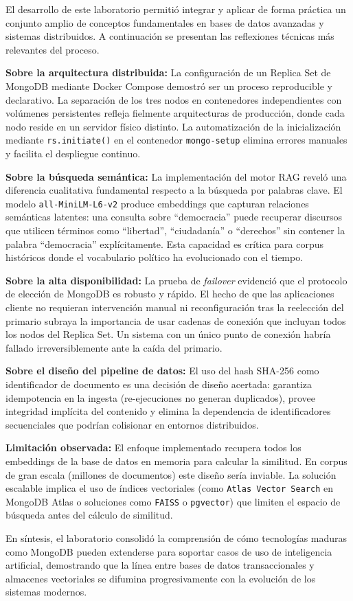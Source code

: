 \documentclass[12pt,a4paper]{article}
\begin{document}
El desarrollo de este laboratorio permitió integrar y aplicar de forma práctica un conjunto amplio de conceptos fundamentales en bases de datos avanzadas y sistemas distribuidos. A continuación se presentan las reflexiones técnicas más relevantes del proceso.

\textbf{Sobre la arquitectura distribuida:} La configuración de un Replica Set de MongoDB mediante Docker Compose demostró ser un proceso reproducible y declarativo. La separación de los tres nodos en contenedores independientes con volúmenes persistentes refleja fielmente arquitecturas de producción, donde cada nodo reside en un servidor físico distinto. La automatización de la inicialización mediante \texttt{rs.initiate()} en el contenedor \texttt{mongo-setup} elimina errores manuales y facilita el despliegue continuo.

\textbf{Sobre la búsqueda semántica:} La implementación del motor RAG reveló una diferencia cualitativa fundamental respecto a la búsqueda por palabras clave. El modelo \texttt{all-MiniLM-L6-v2} produce embeddings que capturan relaciones semánticas latentes: una consulta sobre ``democracia'' puede recuperar discursos que utilicen términos como ``libertad'', ``ciudadanía'' o ``derechos'' sin contener la palabra ``democracia'' explícitamente. Esta capacidad es crítica para corpus históricos donde el vocabulario político ha evolucionado con el tiempo.

\textbf{Sobre la alta disponibilidad:} La prueba de \textit{failover} evidenció que el protocolo de elección de MongoDB es robusto y rápido. El hecho de que las aplicaciones cliente no requieran intervención manual ni reconfiguración tras la reelección del primario subraya la importancia de usar cadenas de conexión que incluyan todos los nodos del Replica Set. Un sistema con un único punto de conexión habría fallado irreversiblemente ante la caída del primario.

\textbf{Sobre el diseño del pipeline de datos:} El uso del hash SHA-256 como identificador de documento es una decisión de diseño acertada: garantiza idempotencia en la ingesta (re-ejecuciones no generan duplicados), provee integridad implícita del contenido y elimina la dependencia de identificadores secuenciales que podrían colisionar en entornos distribuidos.

\textbf{Limitación observada:} El enfoque implementado recupera todos los embeddings de la base de datos en memoria para calcular la similitud. En corpus de gran escala (millones de documentos) este diseño sería inviable. La solución escalable implica el uso de índices vectoriales (como \texttt{Atlas Vector Search} en MongoDB Atlas o soluciones como \texttt{FAISS} o \texttt{pgvector}) que limiten el espacio de búsqueda antes del cálculo de similitud.

En síntesis, el laboratorio consolidó la comprensión de cómo tecnologías maduras como MongoDB pueden extenderse para soportar casos de uso de inteligencia artificial, demostrando que la línea entre bases de datos transaccionales y almacenes vectoriales se difumina progresivamente con la evolución de los sistemas modernos.

\end{document}

